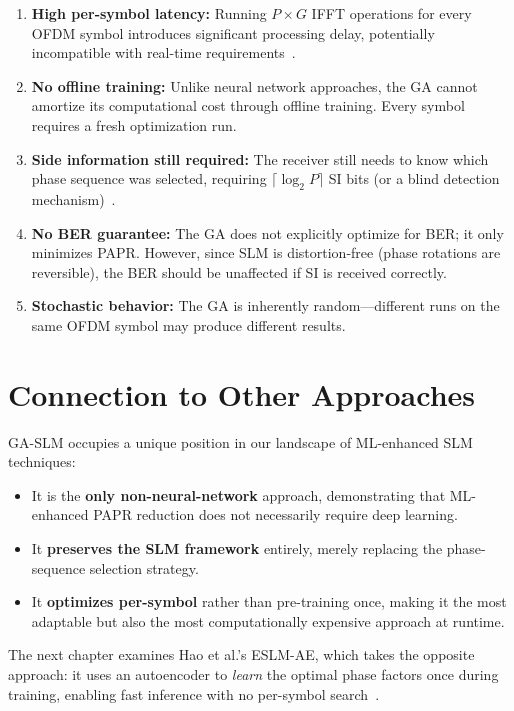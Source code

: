 \begin{enumerate}
    \item \textbf{High per-symbol latency:}
          Running $P \times G$ IFFT operations for every OFDM symbol
          introduces significant processing delay, potentially
          incompatible with real-time requirements~\cite{ali2016new}.

    \item \textbf{No offline training:}
          Unlike neural network approaches, the GA cannot amortize its
          computational cost through offline training.  Every symbol
          requires a fresh optimization run.

    \item \textbf{Side information still required:}
          The receiver still needs to know which phase sequence was
          selected, requiring $\lceil\log_2 P\rceil$ SI bits (or a
          blind detection mechanism)~\cite{ali2016new}.

    \item \textbf{No BER guarantee:}
          The GA does not explicitly optimize for BER; it only
          minimizes PAPR.  However, since SLM is distortion-free
          (phase rotations are reversible), the BER should be
          unaffected if SI is received correctly.

    \item \textbf{Stochastic behavior:}
          The GA is inherently random---different runs on the same
          OFDM symbol may produce different results.
\end{enumerate}


\section{Connection to Other Approaches}
\label{sec:gaslm_connections}

GA-SLM occupies a unique position in our landscape of ML-enhanced SLM
techniques:
\begin{itemize}
    \item It is the \textbf{only non-neural-network} approach, demonstrating
          that ML-enhanced PAPR reduction does not necessarily require
          deep learning.
    \item It \textbf{preserves the SLM framework} entirely, merely
          replacing the phase-sequence selection strategy.
    \item It \textbf{optimizes per-symbol} rather than pre-training once,
          making it the most adaptable but also the most computationally
          expensive approach at runtime.
\end{itemize}

The next chapter examines Hao et al.'s ESLM-AE, which takes the opposite
approach: it uses an autoencoder to \emph{learn} the optimal phase factors
once during training, enabling fast inference with no per-symbol
search~\cite{hao2019extended}.
